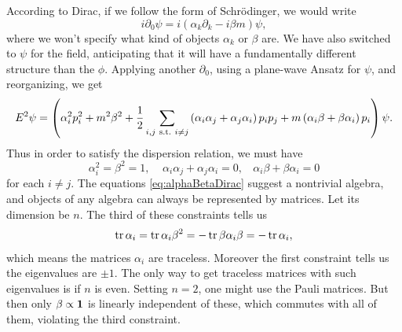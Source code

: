 According to Dirac, if we follow the form of Schr\"odinger, we would write
\begin{equation}\label{eq:protoDirac}
i\partial_0\psi=i\left(\alpha_k\partial_k-i\beta m\right)\psi,
\end{equation}
where we won't specify what kind of objects $\alpha_k$ or $\beta$ are.
We have also switched to $\psi$ for the field, anticipating that it will have a
fundamentally different structure than the $\phi$.
Applying another $\partial_0$, using a plane-wave Ansatz for $\psi$, and
reorganizing, we get
\begin{equation}
E^2\psi=\left(\alpha_i^2p_i^2+m^2\beta^2
+\frac{1}{2}\sum_{i,j~\text{s.t.}~ i\neq
j}\left(\alpha_i\alpha_j+\alpha_j\alpha_i\right)p_ip_j
+m\left(\alpha_i\beta+\beta\alpha_i\right)p_i\right)\psi.
\end{equation}
Thus in order to satisfy the dispersion relation, we must have
\begin{equation}\label{eq:alphaBetaDirac}
\alpha_i^2=\beta^2=1,~~~~~
\alpha_i\alpha_j+\alpha_j\alpha_i=0,~~~~
\alpha_i\beta+\beta\alpha_i=0
\end{equation}
for each $i\neq j$. The equations \eqref{eq:alphaBetaDirac} suggest
a nontrivial algebra, and objects of any algebra can always be represented by
matrices. Let its dimension be $n$. The third of these constraints tells us
\begin{equation}
\tr \alpha_i = \tr \alpha_i\beta^2 = -\tr \beta\alpha_i\beta=-\tr\alpha_i,
\end{equation}
which means the matrices $\alpha_i$ are traceless. Moreover the first constraint
tells us the eigenvalues are $\pm1$. The only way to get traceless matrices with
such eigenvalues is if $n$ is even. Setting $n=2$, one might use the Pauli
matrices. But then only $\beta\propto{\mathbf 1}$ is linearly independent of these,
which commutes with all of them, violating the third constraint. 

